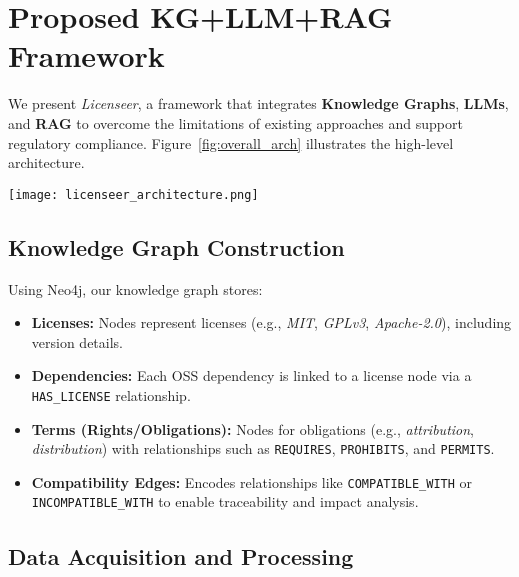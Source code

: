 \documentclass[9pt,twocolumn]{article}
\begin{document}
\section{Proposed KG+LLM+RAG Framework}
\label{sec:our_approach}
We present \textit{Licenseer}, a framework that integrates \textbf{Knowledge Graphs}, \textbf{LLMs}, and \textbf{RAG} to overcome the limitations of existing approaches and support regulatory compliance. Figure~\ref{fig:overall_arch} illustrates the high-level architecture.

\begin{figure*}[!t]
    \centering
    \texttt{[image: licenseer\_architecture.png]}
    \caption{Proposed KG + LLM + RAG Architecture for License Compatibility and Regulatory Compliance. The framework integrates three key components: (1) A Neo4j-based knowledge graph that models licenses, dependencies, and their relationships; (2) An LLM-driven parser that extracts terms from custom licenses; and (3) A RAG module that retrieves relevant regulatory documents to ground explanations in authoritative sources.}
    \label{fig:overall_arch}
\end{figure*}

\subsection{Knowledge Graph Construction}
Using Neo4j, our knowledge graph stores:
\begin{itemize}
    \item \textbf{Licenses:} Nodes represent licenses (e.g., \emph{MIT}, \emph{GPLv3}, \emph{Apache-2.0}), including version details.
    \item \textbf{Dependencies:} Each OSS dependency is linked to a license node via a \texttt{HAS\_LICENSE} relationship.
    \item \textbf{Terms (Rights/Obligations):} Nodes for obligations (e.g., \emph{attribution}, \emph{distribution}) with relationships such as \texttt{REQUIRES}, \texttt{PROHIBITS}, and \texttt{PERMITS}.
    \item \textbf{Compatibility Edges:} Encodes relationships like \texttt{COMPATIBLE\_WITH} or \texttt{INCOMPATIBLE\_WITH} to enable traceability and impact analysis.
\end{itemize}

\subsection{Data Acquisition and Processing}
\label{sec:data_acquisition}
\end{document}
